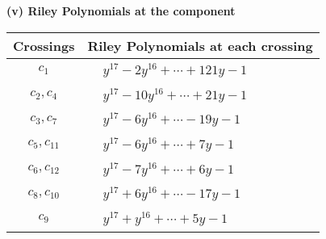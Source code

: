 \documentclass[1p]{elsarticle_modified}
\theoremstyle{definition}
\begin{document}
\newpage\renewcommand{\arraystretch}{1}
\flushleft \textbf{(v) Riley Polynomials at the component}\newline \\
\begin{tabular}{m{50pt}|m{274pt}}
Crossings & \hspace{64pt}Riley Polynomials at each crossing \\
\hline $$\begin{aligned}c_{1}\end{aligned}$$&$\begin{aligned}
&y^{17}-2 y^{16}+\cdots+121 y-1
\end{aligned}$\\
\hline $$\begin{aligned}c_{2},c_{4}\end{aligned}$$&$\begin{aligned}
&y^{17}-10 y^{16}+\cdots+21 y-1
\end{aligned}$\\
\hline $$\begin{aligned}c_{3},c_{7}\end{aligned}$$&$\begin{aligned}
&y^{17}-6 y^{16}+\cdots-19 y-1
\end{aligned}$\\
\hline $$\begin{aligned}c_{5},c_{11}\end{aligned}$$&$\begin{aligned}
&y^{17}-6 y^{16}+\cdots+7 y-1
\end{aligned}$\\
\hline $$\begin{aligned}c_{6},c_{12}\end{aligned}$$&$\begin{aligned}
&y^{17}-7 y^{16}+\cdots+6 y-1
\end{aligned}$\\
\hline $$\begin{aligned}c_{8},c_{10}\end{aligned}$$&$\begin{aligned}
&y^{17}+6 y^{16}+\cdots-17 y-1
\end{aligned}$\\
\hline $$\begin{aligned}c_{9}\end{aligned}$$&$\begin{aligned}
&y^{17}+y^{16}+\cdots+5 y-1
\end{aligned}$\\
\hline
\end{tabular}\\~\\
\end{document}
